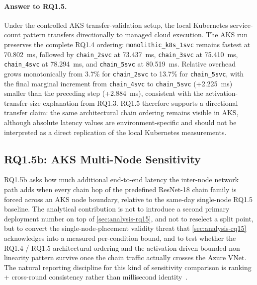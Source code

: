 \paragraph{Answer to RQ1.5.}
Under the controlled AKS transfer-validation setup, the local Kubernetes
service-count pattern transfers directionally to managed cloud execution. The
AKS run preserves the complete RQ1.4 ordering: \texttt{monolithic\_k8s\_1svc}
remains fastest at 70.802~ms, followed by \texttt{chain\_2svc} at 73.437~ms,
\texttt{chain\_3svc} at 75.410~ms, \texttt{chain\_4svc} at 78.294~ms, and
\texttt{chain\_5svc} at 80.519~ms. Relative overhead grows monotonically from
3.7\% for \texttt{chain\_2svc} to 13.7\% for \texttt{chain\_5svc}, with the
final marginal increment from \texttt{chain\_4svc} to \texttt{chain\_5svc}
(+2.225~ms) smaller than the preceding step (+2.884~ms), consistent with the
activation-transfer-size explanation from RQ1.3. RQ1.5 therefore supports a
directional transfer claim: the same architectural chain ordering remains
visible in AKS, although absolute latency values are environment-specific and
should not be interpreted as a direct replication of the local Kubernetes
measurements.

\subsection{RQ1.5b: AKS Multi-Node Sensitivity}
\label{sec:analysis-rq15b}

RQ1.5b asks how much additional end-to-end latency the inter-node network
path adds when every chain hop of the predefined ResNet-18 chain family is
forced across an AKS node boundary, relative to the same-day single-node
RQ1.5 baseline. The analytical contribution is not to introduce a second
primary deployment number on top of \cref{sec:analysis-rq15}, and not to
reselect a split point, but to convert the single-node-placement validity
threat that \cref{sec:analysis-rq15} acknowledges into a measured
per-condition bound, and to test whether the RQ1.4 / RQ1.5 architectural
ordering and the activation-driven bounded-non-linearity pattern survive
once the chain traffic actually crosses the Azure VNet. The natural
reporting discipline for this kind of sensitivity comparison is ranking +
cross-round consistency rather than millisecond
identity~\cite{benchmarking_sc15}.

